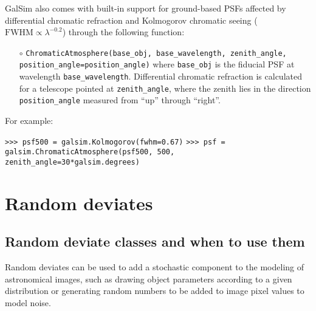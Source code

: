 \documentclass[preprint,11pt]{../../devel/modules/aastex}
\begin{document}
GalSim also comes with built-in support for ground-based PSFs affected by differential chromatic
refraction and Kolmogorov chromatic seeing ($\mathrm{FWHM} \propto \lambda^{-0.2}$) through the
following function:
\begin{itemize}
\item[$\circ$] \texttt{ChromaticAtmosphere(base\_obj, base\_wavelength, zenith\_angle, \newline
  \phantom{ChromaticAtmosphere(}position\_angle=position\_angle)}\newline
  where \texttt{base\_obj} is the fiducial PSF at wavelength \texttt{base\_wavelength}.  Differential
chromatic refraction is calculated for a telescope pointed at \texttt{zenith\_angle}, where the
zenith lies in the direction \texttt{position\_angle} measured from ``up'' through ``right''.
\end{itemize}
For example:

{\tt >>> psf500 = galsim.Kolmogorov(fwhm=0.67)}\newline
{\tt >>> psf = galsim.ChromaticAtmosphere(psf500, 500,\newline
\phantom{>>> psf = galsim.ChromaticAtmosphere(}zenith\_angle=30*galsim.degrees)}\newline

\section{Random deviates}\label{sect:random}
\subsection{Random deviate classes and when to use them}
Random deviates can be used to add a stochastic
component to the modeling of astronomical images, such as drawing
object parameters according to a given distribution or generating random
numbers to be added to image pixel values to model noise.
\end{document}
